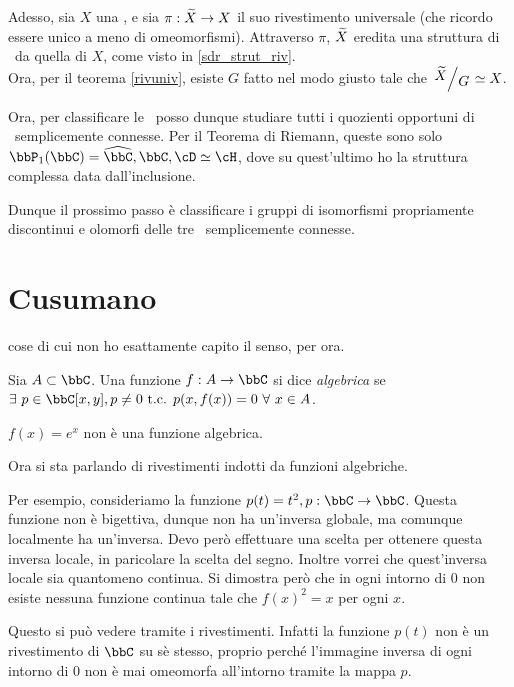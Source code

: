 Adesso, sia $X$ una \sdR, e sia $\pi:\widetilde{X}\rightarrow X$ il suo rivestimento universale (che ricordo essere unico a meno di omeomorfismi). Attraverso $\pi$, $\widetilde{X}$ eredita una struttura di \sdR\ da quella di $X$, come visto in \ref{sdr_strut_riv}.\\
Ora, per il teorema \ref{rivuniv}, esiste $G$ fatto nel modo giusto tale che $\quotient{\ot X}{G}\isom X$.


Ora, per classificare le \sdR\ posso dunque studiare tutti i quozienti opportuni di \sdR\ semplicemente connesse. Per il Teorema di Riemann, queste sono solo $\bbP_1(\bbC)=\oc \bbC, \bbC, \cD\isom\cH$, dove su quest'ultimo ho la struttura complessa data dall'inclusione.

Dunque il prossimo passo è classificare i gruppi di isomorfismi propriamente discontinui e olomorfi delle tre \sdR\ semplicemente connesse.

\section{Cusumano}


 cose di cui non ho esattamente capito il senso, per ora.

\begin{definizione}
	Sia $A\subset\bbC$. Una funzione $f:A\rar\bbC$ si dice \emph{algebrica} se $\exists\ p\in\bbC[x,y], p\neq0 \tc p(x,f(x))=0\ \forall\ x\in A$.
\end{definizione}

\begin{esercizio}
 	$f(x)=e^x$ non è una funzione algebrica.
\end{esercizio}

Ora si sta parlando di rivestimenti indotti da funzioni algebriche.

Per esempio, consideriamo la funzione $p(t)=t^2, p:\bbC\rar\bbC$. Questa funzione non è bigettiva, dunque non ha un'inversa globale, ma comunque localmente ha un'inversa. Devo però effettuare una scelta per ottenere questa inversa locale, in paricolare la scelta del segno. Inoltre vorrei che quest'inversa locale sia quantomeno continua. Si dimostra però che in ogni intorno di $0$ non esiste nessuna funzione continua tale che $f(x)^2=x$ per ogni $x$.

Questo si può vedere tramite i rivestimenti. Infatti la funzione $p(t)$ non è un rivestimento di $\bbC$ su sè stesso, proprio perché l'immagine inversa di ogni intorno di $0$ non è mai omeomorfa all'intorno tramite la mappa $p$.

